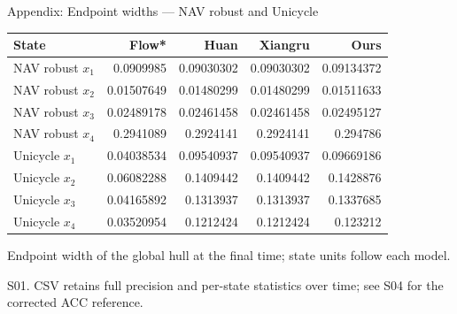 \documentclass[aspectratio=169,11pt]{beamer}
\newcommand{\src}[1]{\par\vfill{\fontsize{7}{9}\selectfont\color{gray}#1\par}}
\begin{document}
\begin{frame}[t]{Appendix: Endpoint widths — NAV robust and Unicycle}
\relax
\relax
{\footnotesize\setlength{\tabcolsep}{3.2pt}\renewcommand{\arraystretch}{1.18}
\noindent\begin{tabular*}{\linewidth}{@{\extracolsep{\fill}}lrrrr@{}}\toprule
\textbf{State} & \textbf{Flow*} & \textbf{Huan} & \textbf{Xiangru} & \textbf{Ours}\\ \midrule
NAV robust \(x_1\) & 0.0909985 & 0.09030302 & 0.09030302 & 0.09134372\\
NAV robust \(x_2\) & 0.01507649 & 0.01480299 & 0.01480299 & 0.01511633\\
NAV robust \(x_3\) & 0.02489178 & 0.02461458 & 0.02461458 & 0.02495127\\
NAV robust \(x_4\) & 0.2941089 & 0.2924141 & 0.2924141 & 0.294786\\
Unicycle \(x_1\) & 0.04038534 & 0.09540937 & 0.09540937 & 0.09669186\\
Unicycle \(x_2\) & 0.06082288 & 0.1409442 & 0.1409442 & 0.1428876\\
Unicycle \(x_3\) & 0.04165892 & 0.1313937 & 0.1313937 & 0.1337685\\
Unicycle \(x_4\) & 0.03520954 & 0.1212424 & 0.1212424 & 0.123212\\
\bottomrule\end{tabular*}\par{}}\vspace{0.25cm}Endpoint width of the global hull at the final time; state units follow each model.
\src{S01. CSV retains full precision and per-state statistics over time; see S04 for the corrected ACC reference.}
\end{frame}
\end{document}
